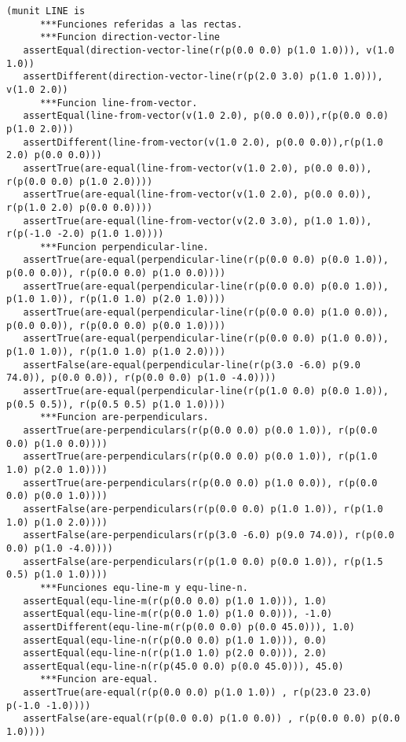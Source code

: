 {\codesize
\begin{verbatim}
(munit LINE is
      ***Funciones referidas a las rectas.
      ***Funcion direction-vector-line
   assertEqual(direction-vector-line(r(p(0.0 0.0) p(1.0 1.0))), v(1.0 1.0))	
   assertDifferent(direction-vector-line(r(p(2.0 3.0) p(1.0 1.0))), v(1.0 2.0))
      ***Funcion line-from-vector.
   assertEqual(line-from-vector(v(1.0 2.0), p(0.0 0.0)),r(p(0.0 0.0) p(1.0 2.0)))
   assertDifferent(line-from-vector(v(1.0 2.0), p(0.0 0.0)),r(p(1.0 2.0) p(0.0 0.0)))
   assertTrue(are-equal(line-from-vector(v(1.0 2.0), p(0.0 0.0)), r(p(0.0 0.0) p(1.0 2.0))))
   assertTrue(are-equal(line-from-vector(v(1.0 2.0), p(0.0 0.0)), r(p(1.0 2.0) p(0.0 0.0))))
   assertTrue(are-equal(line-from-vector(v(2.0 3.0), p(1.0 1.0)), r(p(-1.0 -2.0) p(1.0 1.0))))
      ***Funcion perpendicular-line.
   assertTrue(are-equal(perpendicular-line(r(p(0.0 0.0) p(0.0 1.0)), p(0.0 0.0)), r(p(0.0 0.0) p(1.0 0.0))))
   assertTrue(are-equal(perpendicular-line(r(p(0.0 0.0) p(0.0 1.0)), p(1.0 1.0)), r(p(1.0 1.0) p(2.0 1.0))))
   assertTrue(are-equal(perpendicular-line(r(p(0.0 0.0) p(1.0 0.0)), p(0.0 0.0)), r(p(0.0 0.0) p(0.0 1.0))))
   assertTrue(are-equal(perpendicular-line(r(p(0.0 0.0) p(1.0 0.0)), p(1.0 1.0)), r(p(1.0 1.0) p(1.0 2.0))))
   assertFalse(are-equal(perpendicular-line(r(p(3.0 -6.0) p(9.0 74.0)), p(0.0 0.0)), r(p(0.0 0.0) p(1.0 -4.0))))
   assertTrue(are-equal(perpendicular-line(r(p(1.0 0.0) p(0.0 1.0)), p(0.5 0.5)), r(p(0.5 0.5) p(1.0 1.0))))
      ***Funcion are-perpendiculars.
   assertTrue(are-perpendiculars(r(p(0.0 0.0) p(0.0 1.0)), r(p(0.0 0.0) p(1.0 0.0))))
   assertTrue(are-perpendiculars(r(p(0.0 0.0) p(0.0 1.0)), r(p(1.0 1.0) p(2.0 1.0))))
   assertTrue(are-perpendiculars(r(p(0.0 0.0) p(1.0 0.0)), r(p(0.0 0.0) p(0.0 1.0))))
   assertFalse(are-perpendiculars(r(p(0.0 0.0) p(1.0 1.0)), r(p(1.0 1.0) p(1.0 2.0))))
   assertFalse(are-perpendiculars(r(p(3.0 -6.0) p(9.0 74.0)), r(p(0.0 0.0) p(1.0 -4.0))))
   assertFalse(are-perpendiculars(r(p(1.0 0.0) p(0.0 1.0)), r(p(1.5 0.5) p(1.0 1.0))))
      ***Funciones equ-line-m y equ-line-n.
   assertEqual(equ-line-m(r(p(0.0 0.0) p(1.0 1.0))), 1.0)
   assertEqual(equ-line-m(r(p(0.0 1.0) p(1.0 0.0))), -1.0)
   assertDifferent(equ-line-m(r(p(0.0 0.0) p(0.0 45.0))), 1.0)
   assertEqual(equ-line-n(r(p(0.0 0.0) p(1.0 1.0))), 0.0)
   assertEqual(equ-line-n(r(p(1.0 1.0) p(2.0 0.0))), 2.0)
   assertEqual(equ-line-n(r(p(45.0 0.0) p(0.0 45.0))), 45.0)
      ***Funcion are-equal.
   assertTrue(are-equal(r(p(0.0 0.0) p(1.0 1.0)) , r(p(23.0 23.0) p(-1.0 -1.0))))
   assertFalse(are-equal(r(p(0.0 0.0) p(1.0 0.0)) , r(p(0.0 0.0) p(0.0 1.0))))

\end{verbatim}}
